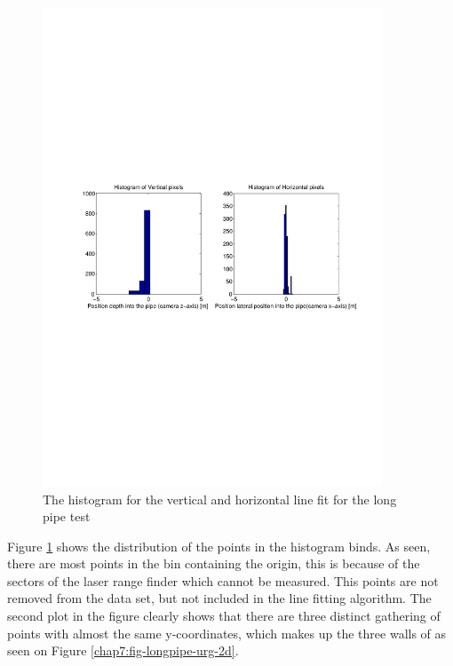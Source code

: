 \begin{figure}[htbp]
    \centering
    \includegraphics[width=0.9\textwidth]{pics/longpipe-urg-hist}
    \caption{The histogram for the vertical and horizontal line fit for the long pipe test}
    \label{chap8:fig-longpipe-urg-hist}
\end{figure}
Figure \ref{chap8:fig-longpipe-urg-hist} shows the distribution of the points in the
histogram binds. As seen, there are most points in the bin containing the origin, this is
because of the sectors of the laser range finder which cannot be measured. This points are
not removed from the data set, but not included in the line fitting algorithm. 
The second plot in the figure clearly shows that there are three distinct gathering of
points with almost the same y-coordinates, which makes up the three walls of as seen on
Figure \ref{chap7:fig-longpipe-urg-2d}.

